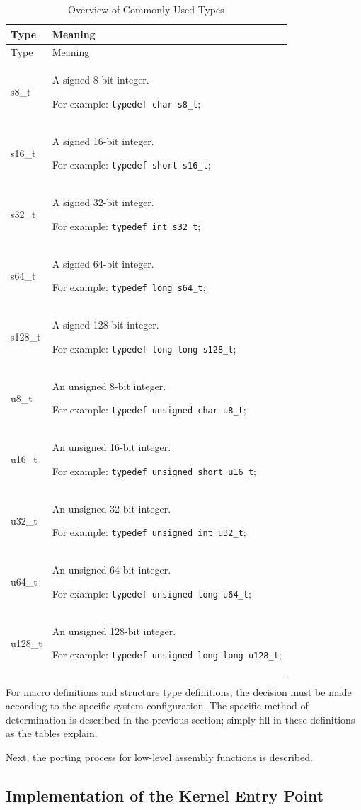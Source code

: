 \begin{xltabular}{\textwidth}{@{}>{\hsize\raggedright\arraybackslash}X>{\hsize\raggedright\arraybackslash}X@{}}
\caption{Overview of Commonly Used Types}\label{tab:7-15-common-types-overview}\\
\toprule
Type & Meaning\tabularnewline
\endfirsthead
\toprule
Type & Meaning\tabularnewline
\midrule
\endhead
\bottomrule
\endlastfoot
s8\_t\strut
 & A signed 8-bit integer.

For example: \texttt{typedef char s8\_t};\strut
\tabularnewline
s16\_t\strut
 & A signed 16-bit integer.

For example: \texttt{typedef short s16\_t};\strut
\tabularnewline
s32\_t\strut
 & A signed 32-bit integer.

For example: \texttt{typedef int s32\_t};\strut
\tabularnewline
s64\_t\strut
 & A signed 64-bit integer.

For example: \texttt{typedef long s64\_t};\strut
\tabularnewline
s128\_t\strut
 & A signed 128-bit integer.

For example: \texttt{typedef long long s128\_t};\strut
\tabularnewline
u8\_t\strut
 & An unsigned 8-bit integer.

For example: \texttt{typedef unsigned char u8\_t};\strut
\tabularnewline
u16\_t\strut
 & An unsigned 16-bit integer.

For example: \texttt{typedef unsigned short u16\_t};\strut
\tabularnewline
u32\_t\strut
 & An unsigned 32-bit integer.

For example: \texttt{typedef unsigned int u32\_t};\strut
\tabularnewline
u64\_t\strut
 & An unsigned 64-bit integer.

For example: \texttt{typedef unsigned long u64\_t};\strut
\tabularnewline
u128\_t\strut
 & An unsigned 128-bit integer.

For example: \texttt{typedef unsigned long long u128\_t};\strut
\tabularnewline
\end{xltabular}
\nopagebreak[4]

For macro definitions and structure type definitions, the decision must be made according to the specific system configuration. The specific method of determination is described in the previous section; simply fill in these definitions as the tables explain.

Next, the porting process for low-level assembly functions is described.

\subsection{Implementation of the Kernel Entry Point}\label{subsec:7-kernel-entry-point-implementation}

